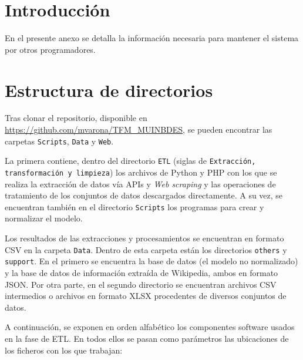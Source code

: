 \label{programador}

\section{Introducción}

En el presente anexo se detalla la información necesaria para mantener el sistema por otros programadores.

\section{Estructura de directorios}

Tras clonar el repositorio, disponible en \url{https://github.com/mvarona/TFM\_MUINBDES}, se pueden encontrar las carpetas \texttt{Scripts}, \texttt{Data} y \texttt{Web}.

La primera contiene, dentro del directorio \texttt{ETL} (siglas de \texttt{Extracción, transformación y limpieza}) los archivos de Python y PHP con los que se realiza la extracción de datos vía APIs y \textit{Web scraping} y las operaciones de tratamiento de los conjuntos de datos descargados directamente. A su vez, se encuentran también en el directorio \texttt{Scripts} los programas para crear y normalizar el modelo.

Los resultados de las extracciones y procesamientos se encuentran en formato CSV en la carpeta \texttt{Data}. Dentro de esta carpeta están los directorios \texttt{others} y \texttt{support}. En el primero se encuentra la base de datos (el modelo no normalizado) y la base de datos de información extraída de Wikipedia, ambos en formato JSON. Por otra parte, en el segundo directorio se encuentran archivos CSV intermedios o archivos en formato XLSX procedentes de diversos conjuntos de datos.

A continuación, se exponen en orden alfabético los componentes software usados en la fase de ETL. En todos ellos se pasan como parámetros las ubicaciones de los ficheros con los que trabajan:


